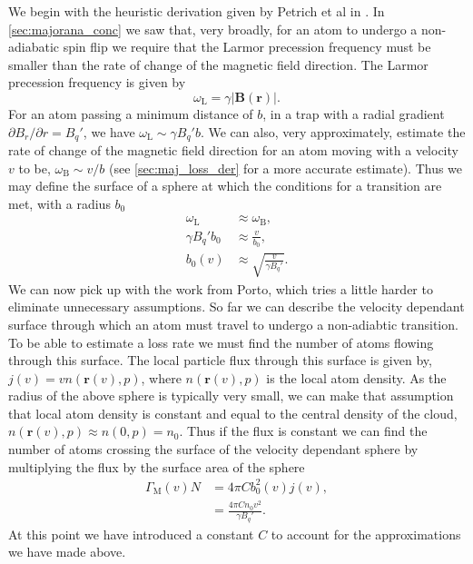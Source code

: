 We begin with the heuristic derivation given by Petrich et al in \cite{Petrich1995}.
In \autoref{sec:majorana_conc} we saw that, very broadly, for an atom to undergo a non-adiabatic spin flip we require that the Larmor precession frequency must be smaller than the rate of change of the magnetic field direction.
The Larmor precession frequency is given by
\begin{equation}
    \omega_{\textrm{L}} = \gamma \vert \mathbf{B}(\mathbf{r}) \vert.
\end{equation}
For an atom passing a minimum distance of $b$, in a trap with a radial gradient $\partial B_r / \partial r = B_q'$, we have $\omega_{\textrm{L}} \sim \gamma B_q' b$. 
We can also, very approximately, estimate the rate of change of the magnetic field direction for an atom moving with a velocity $v$ to be, $\omega_{\mathrm{B}} \sim v / b$ (see \autoref{sec:maj_loss_der} for a more accurate estimate).
Thus we may define the surface of a sphere at which the conditions for a transition are met, with a radius $b_0$
\begin{align}
    \omega_{\textrm{L}} &\approx \omega_{\textrm{B}},\\
    \gamma B_q' b_0 &\approx \frac{v}{b_0},\\
    b_0(v) &\approx \sqrt{\frac{v}{\gamma B_q'}}.
\end{align}
We can now pick up with the work from Porto, which tries a little harder to eliminate unnecessary assumptions.
So far we can describe the velocity dependant surface through which an atom must travel to undergo a non-adiabtic transition.
To be able to estimate a loss rate we must find the number of atoms flowing through this surface.
The local particle flux through this surface is given by, $j(v) = v n( \mathbf{r}(v),p)$, where $n(\mathbf{r}(v),p)$ is the local atom density. 
As the radius of the above sphere is typically very small, we can make that assumption that local atom density is constant and equal to the central density of the cloud, $n(\mathbf{r}(v),p) \approx n(0,p) = n_0$.
Thus if the flux is constant we can find the number of atoms crossing the surface of the velocity dependant sphere by multiplying the flux by the surface area of the sphere
\begin{align}
    \Gamma_{\textrm{M}}(v)N &= 4\pi C b_0^2(v)j(v),\\ 
    &= \frac{ 4\pi C n_0 v^2 } { \gamma B_q'}.
\end{align}
At this point we have introduced a constant $C$ to account for the approximations we have made above.
